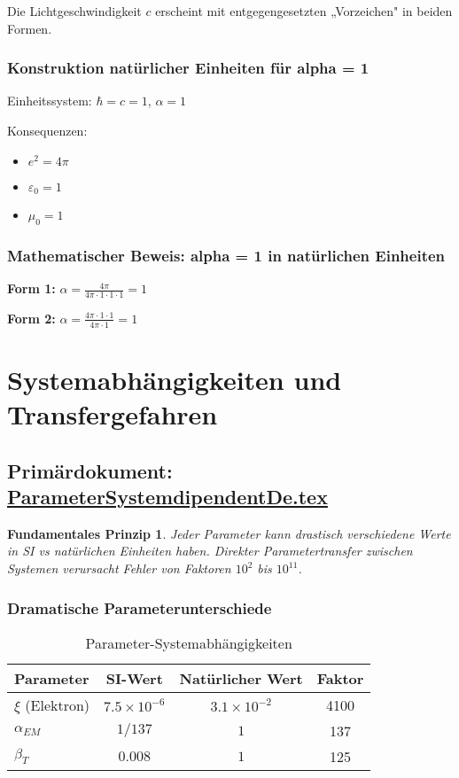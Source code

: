 \documentclass[12pt,a4paper]{report}
\newtheorem{principle}{Fundamentales Prinzip}[chapter]
\begin{document}
	Die Lichtgeschwindigkeit $c$ erscheint mit entgegengesetzten „Vorzeichen" in beiden Formen.
	
	\subsubsection{Konstruktion natürlicher Einheiten für alpha = 1}
	Einheitssystem: $\hbar = c = 1$, $\alpha = 1$
	
	Konsequenzen:
	\begin{itemize}
		\item $e^2 = 4\pi$
		\item $\varepsilon_0 = 1$
		\item $\mu_0 = 1$
	\end{itemize}
	
	\subsubsection{Mathematischer Beweis: alpha = 1 in natürlichen Einheiten}
	\textbf{Form 1:} $\alpha = \frac{4\pi}{4\pi \cdot 1 \cdot 1 \cdot 1} = 1$ \checkmark
	
	\textbf{Form 2:} $\alpha = \frac{4\pi \cdot 1 \cdot 1}{4\pi \cdot 1} = 1$ \checkmark
	
	\section{Systemabhängigkeiten und Transfergefahren}
	\subsection{Primärdokument: \href{https://github.com/jpascher/T0-Time-Mass-Duality/tree/main/2/pdf/ParameterSystemdipendentDe.pdf}{ParameterSystemdipendentDe.tex}}
	
	\begin{principle}
		Jeder Parameter kann drastisch verschiedene Werte in SI vs natürlichen Einheiten haben. Direkter Parametertransfer zwischen Systemen verursacht Fehler von Faktoren $10^2$ bis $10^{11}$.
	\end{principle}
	
	\subsubsection{Dramatische Parameterunterschiede}
	\begin{table}[H]
		\centering
		\begin{tabular}{lccc}
			\toprule
			\textbf{Parameter} & \textbf{SI-Wert} & \textbf{Natürlicher Wert} & \textbf{Faktor} \\
			\midrule
			$\xi$ (Elektron) & $7.5 \times 10^{-6}$ & $3.1 \times 10^{-2}$ & 4100 \\
			$\alpha_{EM}$ & $1/137$ & $1$ & 137 \\
			$\beta_T$ & $0.008$ & $1$ & 125 \\
			\bottomrule
		\end{tabular}
		\caption{Parameter-Systemabhängigkeiten}
		\label{tab:parameter-systems}
	\end{table}
	
\end{document}
